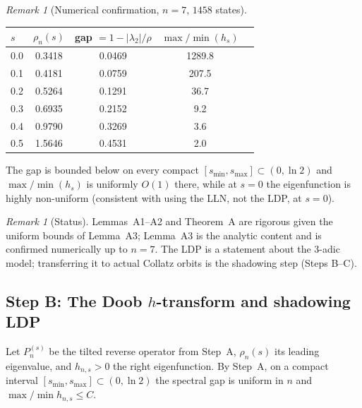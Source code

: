\documentclass[12pt,a4paper]{article}
\theoremstyle{remark}
\newtheorem{remark}[theorem]{Remark}
\begin{document}
\begin{remark}[Numerical confirmation, $n=7$, $1458$ states]
\begin{center}
\begin{tabular}{lcccc}
\toprule
$s$ & $\rho_n(s)$ & gap $=1-|\lambda_2|/\rho$ & $\max/\min(h_s)$ \\
\midrule
0.0 & 0.3418 & 0.0469 & 1289.8 \\
0.1 & 0.4181 & 0.0759 & 207.5 \\
0.2 & 0.5264 & 0.1291 & 36.7 \\
0.3 & 0.6935 & 0.2152 & 9.2 \\
0.4 & 0.9790 & 0.3269 & 3.6 \\
0.5 & 1.5646 & 0.4531 & 2.0 \\
\bottomrule
\end{tabular}
\end{center}
The gap is bounded below on every compact $[s_{\min},s_{\max}]\subset(0,\ln2)$ and $\max/\min(h_s)$ is uniformly $O(1)$ there, while at $s=0$ the eigenfunction is highly non-uniform (consistent with using the LLN, not the LDP, at $s=0$).
\end{remark}
\begin{remark}[Status]
Lemmas~A1--A2 and Theorem~A are rigorous given the uniform bounds of Lemma~A3; Lemma~A3 is the analytic content and is confirmed numerically up to $n=7$. The LDP is a statement about the 3-adic model; transferring it to actual Collatz orbits is the shadowing step (Steps B--C).
\end{remark}

\subsection{Step B: The Doob $h$-transform and shadowing LDP}
\label{subsec:step_b}
Let $P_n^{(s)}$ be the tilted reverse operator from Step~A, $\rho_n(s)$ its leading eigenvalue, and $h_{n,s}>0$ the right eigenfunction. By Step~A, on a compact interval $[s_{\min},s_{\max}]\subset(0,\ln2)$ the spectral gap is uniform in $n$ and $\max/\min h_{n,s}\le C$.
\end{document}
